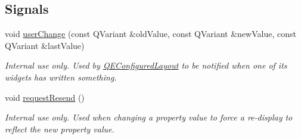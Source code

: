 \subsection*{Signals}
\begin{DoxyCompactItemize}
\item 
\hypertarget{classQEGenericEdit_ae82720428e2102045d6cce86c4b902f4}{
void \hyperlink{classQEGenericEdit_ae82720428e2102045d6cce86c4b902f4}{userChange} (const QVariant \&oldValue, const QVariant \&newValue, const QVariant \&lastValue)}
\label{classQEGenericEdit_ae82720428e2102045d6cce86c4b902f4}

\begin{DoxyCompactList}\small\item\em Internal use only. Used by \hyperlink{classQEConfiguredLayout}{QEConfiguredLayout} to be notified when one of its widgets has written something. \end{DoxyCompactList}\item 
\hypertarget{classQEGenericEdit_ab3039c4d18b0b2c55ca1698f5c91c04c}{
void \hyperlink{classQEGenericEdit_ab3039c4d18b0b2c55ca1698f5c91c04c}{requestResend} ()}
\label{classQEGenericEdit_ab3039c4d18b0b2c55ca1698f5c91c04c}

\begin{DoxyCompactList}\small\item\em Internal use only. Used when changing a property value to force a re-\/display to reflect the new property value. \end{DoxyCompactList}\end{DoxyCompactItemize}
